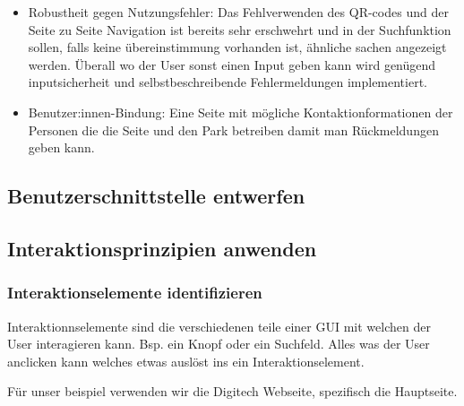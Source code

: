 \documentclass[10pt]{article}
\newcounter{subsubsubsection}[subsubsection]
\begin{document}
\begin{itemize}
		\item Robustheit gegen Nutzungsfehler: Das Fehlverwenden des QR-codes und der Seite zu Seite Navigation ist bereits sehr erschwehrt und in der Suchfunktion sollen, falls keine übereinstimmung vorhanden ist, ähnliche sachen angezeigt werden. Überall wo der User sonst einen Input geben kann wird genügend inputsicherheit und selbstbeschreibende Fehlermeldungen implementiert.
		
		\item Benutzer:innen-Bindung: Eine Seite mit mögliche Kontaktionformationen der Personen die die Seite und den Park betreiben damit man Rückmeldungen geben kann. 
		
	\end{itemize}
	\subsection{Benutzerschnittstelle entwerfen}
	\subsection{Interaktionsprinzipien anwenden}
	\subsubsection{Interaktionselemente identifizieren}
	
	Interaktionnselemente sind die verschiedenen teile einer GUI mit welchen der User interagieren kann. Bsp. ein Knopf oder ein Suchfeld. Alles was der User anclicken kann welches etwas auslöst ins ein Interaktionselement.
	
	Für unser beispiel verwenden wir die Digitech Webseite, spezifisch die Hauptseite.
	
\end{document}
